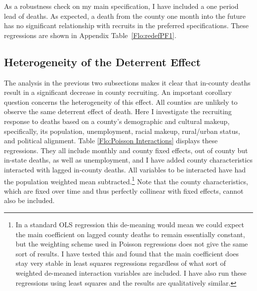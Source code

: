 \documentclass[12pt] {article}
\begin{document}
As a robustness check on my main specification, I have included a one period lead of deaths. As expected, a death from the county one month into the future has no significant relationship with recruits in the preferred specifications. These regressions are shown in Appendix Table~\ref{Flo:redefPF1}. 

\subsection{Heterogeneity of the Deterrent Effect\label{sub:interactions}}

The analysis in the previous two subsections makes it clear that in-county
deaths result in a significant decrease in county recruiting. An important
corollary question concerns the heterogeneity of this effect.
All counties are unlikely to observe the same deterrent effect of
death. Here I investigate the recruiting response to deaths based
on a county's demographic and cultural makeup, specifically, its population,
unemployment, racial makeup, rural/urban status, and political alignment.
Table \ref{Flo:Poisson Interactions} displays these regressions.
They all include monthly and county fixed effects, out of county but
in-state deaths, as well as unemployment, and I have added county
characteristics interacted with lagged in-county deaths. All variables
to be interacted have had the population weighted mean subtracted.\footnote{
In a standard OLS regression this de-meaning would mean we could expect
the main coefficient on lagged county deaths to remain essentially constant,
but the weighting scheme used in Poisson regressions does not give
the same sort of results. I have tested this and found that the main
coefficient does stay very stable in least squares regressions regardless
of what sort of weighted de-meaned interaction variables are included.
I have also run these regressions using least squares and the results
are qualitatively similar.} Note that the county characteristics, which are fixed over time and thus perfectly collinear with fixed effects, cannot also be included.
\end{document}
